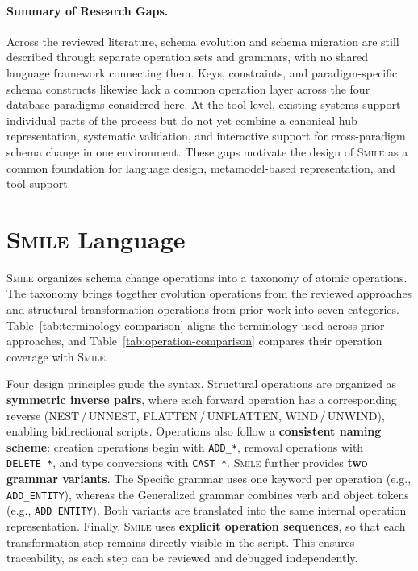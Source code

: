 \documentclass{llncs}
\begin{document}
\paragraph{Summary of Research Gaps.}
Across the reviewed literature, schema evolution and schema
migration are still described through separate operation sets
and grammars, with no shared language framework connecting them.
Keys, constraints, and paradigm-specific schema constructs
likewise lack a common operation layer across the four database
paradigms considered here. At the tool level, existing systems
support individual parts of the process but do not yet combine
a canonical hub representation, systematic validation, and
interactive support for cross-paradigm schema change in one
environment. These gaps motivate the design of \textsc{Smile} as a
common foundation for language design, metamodel-based
representation, and tool support.


\section{\textsc{Smile} Language}
\label{sec:operation-taxonomy}

\textsc{Smile} organizes schema change operations into a taxonomy of atomic operations.
The taxonomy brings together evolution operations from the reviewed approaches and structural transformation operations from prior work
into seven categories.
Table~\ref{tab:terminology-comparison} aligns the terminology used across prior approaches, and Table~\ref{tab:operation-comparison} compares their operation coverage with \textsc{Smile}.

Four design principles guide the syntax.
Structural operations are organized as \textbf{symmetric inverse pairs}, where each forward operation has a corresponding reverse (NEST\,/\,UNNEST, FLATTEN\,/\,UNFLATTEN, WIND\,/\,UNWIND), enabling bidirectional scripts.
Operations also follow a \textbf{consistent naming scheme}: creation operations begin with \texttt{ADD\_*}, removal operations with \texttt{DELETE\_*}, and type conversions with \texttt{CAST\_*}.
\textsc{Smile} further provides \textbf{two grammar variants}. The Specific grammar uses one keyword per operation (e.g., \texttt{ADD\_ENTITY}), whereas the Generalized grammar combines verb and object tokens (e.g., \texttt{ADD ENTITY}). Both variants are translated into the same internal operation representation.
Finally, \textsc{Smile} uses \textbf{explicit operation sequences}, so that each transformation step remains directly visible in the script. This ensures traceability, as each step can be reviewed and debugged independently.
\end{document}
